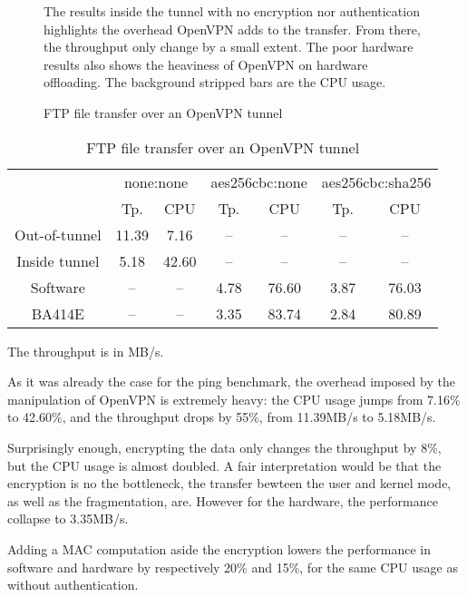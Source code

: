 \begin{figure}[ht]

\caption{FTP file transfer over an OpenVPN tunnel}{The results inside the tunnel with no encryption nor authentication highlights the overhead OpenVPN adds to the transfer. From there, the throughput only change by a small extent. The poor hardware results also shows the heaviness of OpenVPN on hardware offloading. The background stripped bars are the CPU usage.}
\label{fig:openvpn-ftp-bench}
\end{figure}

\begin{table}[ht]
\center
\small
\begin{tabular}{l|c|c|c|c|c|c|} \cline{2-7}
 & \multicolumn{2}{c|}{none:none} & \multicolumn{2}{c|}{aes256cbc:none} & \multicolumn{2}{c|}{aes256cbc:sha256} \\ \cline{2-7}
 & Tp.  & CPU & Tp.  & CPU & Tp.  & CPU \\ \hline
\multicolumn{1}{|c|}{Out-of-tunnel} & 11.39 & 7.16 & -- & -- & -- & -- \\ \hline
\multicolumn{1}{|c|}{Inside tunnel} & 5.18 & 42.60 & -- & -- & -- & -- \\ \hline
\multicolumn{1}{|c|}{Software} & -- & -- & 4.78 & 76.60 & 3.87 & 76.03 \\ \hline
\multicolumn{1}{|c|}{BA414E} & -- & -- & 3.35 & 83.74 & 2.84 & 80.89 \\ \hline
\end{tabular}
\caption{FTP file transfer over an OpenVPN tunnel}{The throughput is in MB/s.}
\label{tab:openvpn-ftp-bench}
\end{table}

As it was already the case for the ping benchmark, the overhead imposed by the manipulation of OpenVPN is extremely heavy: the CPU usage jumps from 7.16\% to 42.60\%, and the throughput drops by 55\%, from 11.39MB/s to 5.18MB/s.

\noindent Surprisingly enough, encrypting the data only changes the throughput by 8\%, but the CPU usage is almost doubled.
A fair interpretation would be that the encryption is no the bottleneck, the transfer bewteen the user and kernel mode, as well as the fragmentation, are.
However for the hardware, the performance collapse to 3.35MB/s.

Adding a MAC computation aside the encryption lowers the performance in software and hardware by respectively 20\% and 15\%, for the same CPU usage as without authentication.


